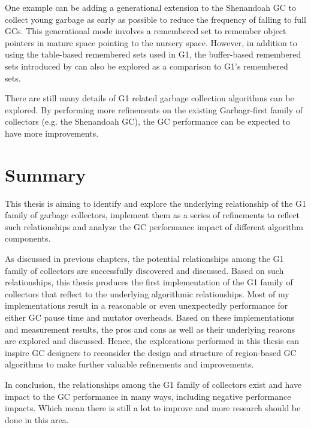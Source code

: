 One example can be adding a generational extension to the Shenandoah GC to collect
young garbage as early as possible to reduce the frequency of falling to full GCs.
This generational mode involves a remembered set to remember object pointers in mature
space pointing to the nursery space. However, in addition to using the table-based remembered
sets used in G1, the buffer-based remembered sets introduced by \cite{blackburn2008immix} can
also be explored as a comparison to G1's remembered sets.

There are still many details of G1 related garbage collection algorithms can be
explored. By performing more refinements on the existing Garbagr-first family of collectors
(e.g. the Shenandoah GC), the GC performance can be expected to have more improvements.

\section{Summary}

This thesis is aiming to identify and explore the underlying relationship of the
G1 family of garbage collectors, implement them as a series of refinements to
reflect such relationships and analyze the GC performance impact of different algorithm components.

As discussed in previous chapters, the potential relationships among the G1 family of collectors
are successfully discovered and discussed.
Based on such relationships, this thesis produces the first implementation of the
G1 family of collectors that reflect to the underlying algorithmic relationships.
Most of my implementations result in a reasonable
or even unexpectedly performance for either GC pause time and mutator overheads.
Based on these implementations and measurement results, the pros and cons as well
as their underlying reasons are explored and discussed.
Hence, the explorations performed in this thesis can inspire GC designers to
reconsider the design and structure of region-based GC algorithms to make
further valuable refinements and improvements.

In conclusion, the relationships among the G1 family of collectors exist and have
impact to the GC performance in many ways, including negative performance impacts.
Which mean there is still a lot to improve and more research should be done in this area.





